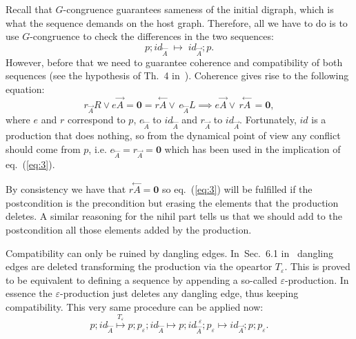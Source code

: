 \documentclass{fundam}
\begin{document}
Recall that $G$-congruence guarantees sameness of the initial digraph,
which is what the sequence demands on the host graph. Therefore, all
we have to do is to use $G$-congruence to check the differences in the
two sequences:
\begin{equation}
  \label{eq:1}
  p ; id_{\stackrel{\leftarrow}{A}} \; \longmapsto \;
  id_{\stackrel{\rightarrow}{A}} ; p.
\end{equation}
However, before that we need to guarantee coherence and compatibility
of both sequences (see the hypothesis of Th.~4
in~\cite{MGGCombinatorics}). Coherence gives rise to the following
equation:
\begin{equation}
  \label{eq:3}
  r_{\stackrel{\rightarrow}{A}} R \vee e {\stackrel{\rightarrow}{A}} =
  \mathbf{0} = r\!\!\stackrel{\leftarrow}{A} \vee \,
  e_{\stackrel{\leftarrow}{A}} L \implies
  e\!\!\stackrel{\rightarrow}{A} \vee \, r\!\!\stackrel{\leftarrow}{A}
  \, = \mathbf{0},
\end{equation}
where $e$ and $r$ correspond to $p$, $e_{\stackrel{\leftarrow}{A}}$ to
$id_{\stackrel{\leftarrow}{A}}$ and $r_{\stackrel{\rightarrow}{A}}$ to
$id_{\stackrel{\rightarrow}{A}}$. Fortunately, $id$ is a production
that does nothing, so from the dynamical point of view any conflict
should come from $p$, i.e. $e_{\stackrel{\leftarrow}{A}} =
r_{\stackrel{\rightarrow}{A}} = \mathbf{0}$ which has been used in the
implication of eq.~(\ref{eq:3}).

By consistency we have that $r\!\!\stackrel{\leftarrow}{A} =
\mathbf{0}$ so eq.~(\ref{eq:3}) will be fulfilled if the
postcondition is the precondition but erasing the elements that the
production deletes. A similar reasoning for the nihil part tells us
that we should add to the postcondition all those elements added by
the production.

Compatibility can only be ruined by dangling edges. In~Sec.~6.1
in~\cite{MGGBook} dangling edges are deleted transforming the
production via the opeartor $T_\varepsilon$. This is proved to be
equivalent to defining a sequence by appending a so-called
$\varepsilon$-production. In essence the $\varepsilon$-production just
deletes any dangling edge, thus keeping compatibility. This very same
procedure can be applied now:
\begin{equation}
  \label{eq:7}
  p; id_{\stackrel{\leftarrow}{A}}
  \stackrel{T_\varepsilon}{\longmapsto} p; p_\varepsilon;
  id_{\stackrel{\leftarrow}{A}} \longmapsto p;
  id^{\phantom{i}\varepsilon}_{\stackrel{\leftarrow}{A}}; p_\varepsilon \longmapsto
  id_{\stackrel{\rightarrow}{A}}; p; p_\varepsilon.
\end{equation}
\end{document}
